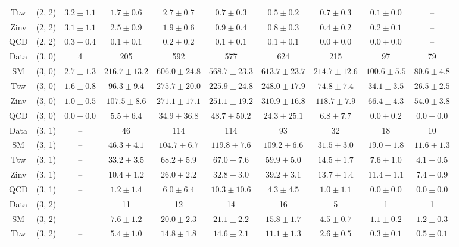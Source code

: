 \begin{table}[h!]
{\begin{tabular}{cccccccccc}
	Ttw & (2, 2) & $3.2\pm 1.1$ & $1.7\pm 0.6$ & $2.7\pm 0.7$ & $0.7\pm 0.3$ & $0.5\pm 0.2$ & $0.7\pm 0.3$ & $0.1\pm 0.0$ & -- \\[0.5ex] 
	Zinv & (2, 2) & $3.1\pm 1.1$ & $2.5\pm 0.9$ & $1.9\pm 0.6$ & $0.9\pm 0.4$ & $0.8\pm 0.3$ & $0.4\pm 0.2$ & $0.2\pm 0.1$ & -- \\[0.5ex] 
	QCD & (2, 2) & $0.3\pm 0.4$ & $0.1\pm 0.1$ & $0.2\pm 0.2$ & $0.1\pm 0.1$ & $0.1\pm 0.1$ & $0.0\pm 0.0$ & $0.0\pm 0.0$ & -- \\[0.5ex] 
	Data & (3, 0) & 4 & 205 & 592 & 577 & 624 & 215 & 97 & 79 \\[0.5ex] 
	SM & (3, 0) & $2.7\pm 1.3$ & $216.7\pm 13.2$ & $606.0\pm 24.8$ & $568.7\pm 23.3$ & $613.7\pm 23.7$ & $214.7\pm 12.6$ & $100.6\pm 5.5$ & $80.6\pm 4.8$ \\[0.5ex] 
	Ttw & (3, 0) & $1.6\pm 0.8$ & $96.3\pm 9.4$ & $275.7\pm 20.0$ & $225.9\pm 24.8$ & $248.0\pm 17.9$ & $74.8\pm 7.4$ & $34.1\pm 3.5$ & $26.5\pm 2.5$ \\[0.5ex] 
	Zinv & (3, 0) & $1.0\pm 0.5$ & $107.5\pm 8.6$ & $271.1\pm 17.1$ & $251.1\pm 19.2$ & $310.9\pm 16.8$ & $118.7\pm 7.9$ & $66.4\pm 4.3$ & $54.0\pm 3.8$ \\[0.5ex] 
	QCD & (3, 0) & $0.0\pm 0.0$ & $5.5\pm 6.4$ & $34.9\pm 36.8$ & $48.7\pm 50.2$ & $24.3\pm 25.1$ & $6.8\pm 7.7$ & $0.0\pm 0.2$ & $0.0\pm 0.0$ \\[0.5ex] 
	Data & (3, 1) & -- & 46 & 114 & 114 & 93 & 32 & 18 & 10 \\[0.5ex] 
	SM & (3, 1) & -- & $46.3\pm 4.1$ & $104.7\pm 6.7$ & $119.8\pm 7.6$ & $109.2\pm 6.6$ & $31.5\pm 3.0$ & $19.0\pm 1.8$ & $11.6\pm 1.3$ \\[0.5ex] 
	Ttw & (3, 1) & -- & $33.2\pm 3.5$ & $68.2\pm 5.9$ & $67.0\pm 7.6$ & $59.9\pm 5.0$ & $14.5\pm 1.7$ & $7.6\pm 1.0$ & $4.1\pm 0.5$ \\[0.5ex] 
	Zinv & (3, 1) & -- & $10.4\pm 1.2$ & $26.0\pm 2.2$ & $32.8\pm 3.0$ & $39.2\pm 3.1$ & $13.7\pm 1.4$ & $11.4\pm 1.1$ & $7.4\pm 0.9$ \\[0.5ex] 
	QCD & (3, 1) & -- & $1.2\pm 1.4$ & $6.0\pm 6.4$ & $10.3\pm 10.6$ & $4.3\pm 4.5$ & $1.0\pm 1.1$ & $0.0\pm 0.0$ & $0.0\pm 0.0$ \\[0.5ex] 
	Data & (3, 2) & -- & 11 & 12 & 14 & 16 & 5 & 1 & 1 \\[0.5ex] 
	SM & (3, 2) & -- & $7.6\pm 1.2$ & $20.0\pm 2.3$ & $21.1\pm 2.2$ & $15.8\pm 1.7$ & $4.5\pm 0.7$ & $1.1\pm 0.2$ & $1.2\pm 0.3$ \\[0.5ex] 
	Ttw & (3, 2) & -- & $5.4\pm 1.0$ & $14.8\pm 1.8$ & $14.6\pm 2.1$ & $11.1\pm 1.3$ & $2.6\pm 0.5$ & $0.3\pm 0.1$ & $0.5\pm 0.1$ \\[0.5ex] 

\end{tabular}}
\end{table}
